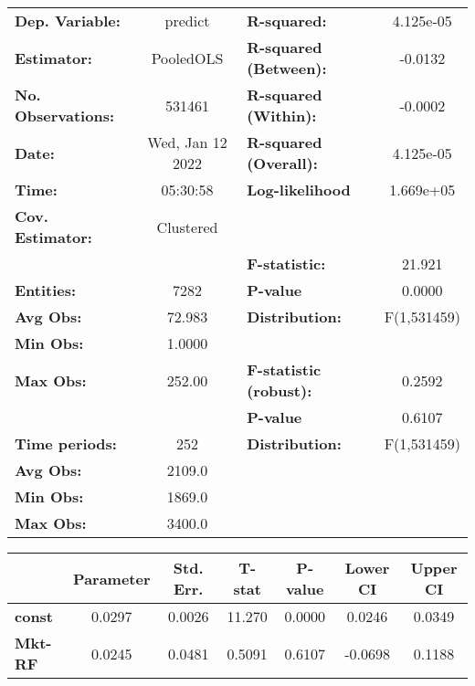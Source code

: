 \begin{center}
\begin{tabular}{lclc}
\toprule
\textbf{Dep. Variable:}    &      predict       & \textbf{  R-squared:         }   &    4.125e-05     \\
\textbf{Estimator:}        &     PooledOLS      & \textbf{  R-squared (Between):}  &     -0.0132      \\
\textbf{No. Observations:} &       531461       & \textbf{  R-squared (Within):}   &     -0.0002      \\
\textbf{Date:}             &  Wed, Jan 12 2022  & \textbf{  R-squared (Overall):}  &    4.125e-05     \\
\textbf{Time:}             &      05:30:58      & \textbf{  Log-likelihood     }   &    1.669e+05     \\
\textbf{Cov. Estimator:}   &     Clustered      & \textbf{                     }   &                  \\
\textbf{}                  &                    & \textbf{  F-statistic:       }   &      21.921      \\
\textbf{Entities:}         &        7282        & \textbf{  P-value            }   &      0.0000      \\
\textbf{Avg Obs:}          &       72.983       & \textbf{  Distribution:      }   &   F(1,531459)    \\
\textbf{Min Obs:}          &       1.0000       & \textbf{                     }   &                  \\
\textbf{Max Obs:}          &       252.00       & \textbf{  F-statistic (robust):} &      0.2592      \\
\textbf{}                  &                    & \textbf{  P-value            }   &      0.6107      \\
\textbf{Time periods:}     &        252         & \textbf{  Distribution:      }   &   F(1,531459)    \\
\textbf{Avg Obs:}          &       2109.0       & \textbf{                     }   &                  \\
\textbf{Min Obs:}          &       1869.0       & \textbf{                     }   &                  \\
\textbf{Max Obs:}          &       3400.0       & \textbf{                     }   &                  \\
\bottomrule
\end{tabular}
\begin{tabular}{lcccccc}
                & \textbf{Parameter} & \textbf{Std. Err.} & \textbf{T-stat} & \textbf{P-value} & \textbf{Lower CI} & \textbf{Upper CI}  \\
\midrule
\textbf{const}  &       0.0297       &       0.0026       &      11.270     &      0.0000      &       0.0246      &       0.0349       \\
\textbf{Mkt-RF} &       0.0245       &       0.0481       &      0.5091     &      0.6107      &      -0.0698      &       0.1188       \\
\bottomrule
\end{tabular}
\end{center}
